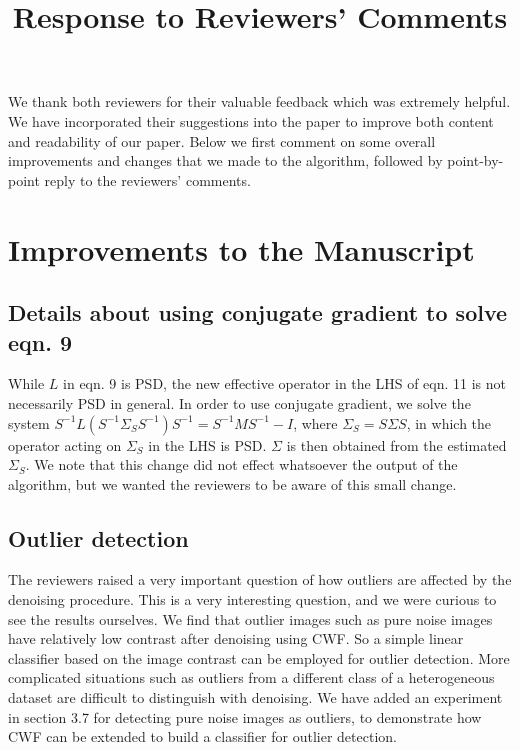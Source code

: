 \documentclass{article}
\title{Response to Reviewers' Comments}
\begin{document}
\maketitle

We thank both reviewers for their valuable feedback which was extremely
helpful. We have incorporated their suggestions into the paper to improve both content and
readability of our paper. Below we first comment on some overall improvements and changes that 
we made to the algorithm, followed by point-by-point reply to the reviewers' comments. 

\section*{Improvements to the Manuscript}
\subsection*{Details about using conjugate gradient to solve eqn. 9 }
While $L$ in eqn. 9 is PSD, the new effective operator in the LHS of eqn. 11 is not necessarily PSD in general.
In order to use conjugate gradient, we solve the system $S^{-1}L(S^{-1}\Sigma_S S^{-1})S^{-1} = S^{-1}MS^{-1}-I$, where
$\Sigma_S = S \Sigma S$, in which the operator acting on $\Sigma_S$ in the LHS is PSD. $\Sigma$ is then obtained
from the estimated $\Sigma_S$. We note that this change did not effect whatsoever the output of the algorithm,
but we wanted the reviewers to be aware of this small change.

\subsection*{Outlier detection}
The reviewers raised a very important question of how outliers are affected by the denoising procedure.
This is a very interesting question, and we were curious to see
the results ourselves. We find that outlier images such as pure noise images have
relatively low contrast after denoising using CWF. So a simple linear classifier
based on the image contrast can be employed for outlier detection. More complicated situations
such as outliers from a different class of a heterogeneous dataset are difficult to distinguish
with denoising. We have added an experiment in section 3.7 for detecting pure noise images as outliers, to demonstrate
how CWF can be extended to build a classifier for outlier detection.
\end{document}
